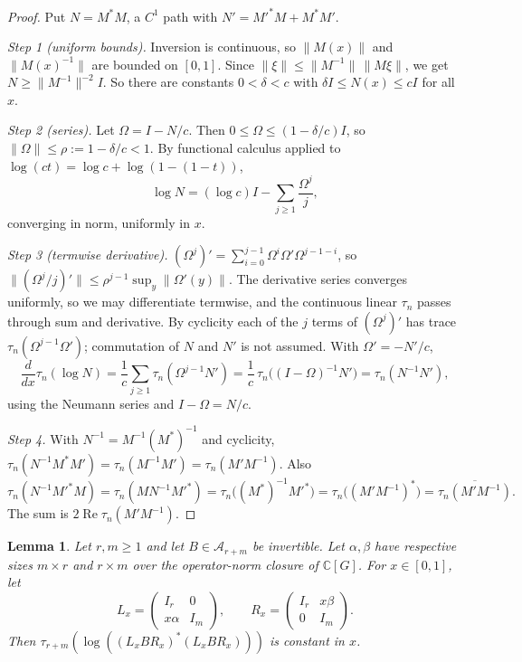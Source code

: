 \documentclass[11pt]{article}
\newtheorem{lemma}[theorem]{Lemma}
\theoremstyle{remark}
\numberwithin{equation}{section}
\newcommand{\C}{\mathbb C}
\begin{document}
\begin{proof}
Put $N=M^*M$, a $C^1$ path with $N'=M'^*M+M^*M'$.

\emph{Step 1 (uniform bounds).} Inversion is continuous, so $\|M(x)\|$ and $\|M(x)^{-1}\|$ are bounded on $[0,1]$. Since $\|\xi\|\le\|M^{-1}\|\,\|M\xi\|$, we get $N\ge\|M^{-1}\|^{-2}I$. So there are constants $0<\delta<c$ with $\delta I\le N(x)\le cI$ for all $x$.

\emph{Step 2 (series).} Let $\Omega=I-N/c$. Then $0\le\Omega\le(1-\delta/c)I$, so $\|\Omega\|\le\rho:=1-\delta/c<1$. By functional calculus applied to $\log(ct)=\log c+\log(1-(1-t))$,
\[
 \log N=(\log c)I-\sum_{j\ge1}\frac{\Omega^j}{j},
\]
converging in norm, uniformly in $x$.

\emph{Step 3 (termwise derivative).} $(\Omega^j)'=\sum_{i=0}^{j-1}\Omega^i\Omega'\Omega^{j-1-i}$, so $\|(\Omega^j/j)'\|\le\rho^{j-1}\sup_y\|\Omega'(y)\|$. The derivative series converges uniformly, so we may differentiate termwise, and the continuous linear $\tau_n$ passes through sum and derivative. By cyclicity each of the $j$ terms of $(\Omega^j)'$ has trace $\tau_n(\Omega^{j-1}\Omega')$; commutation of $N$ and $N'$ is not assumed. With $\Omega'=-N'/c$,
\[
 \frac{d}{dx}\tau_n(\log N)
 =\frac1c\sum_{j\ge1}\tau_n(\Omega^{j-1}N')
 =\frac1c\,\tau_n\bigl((I-\Omega)^{-1}N'\bigr)
 =\tau_n(N^{-1}N'),
\]
using the Neumann series and $I-\Omega=N/c$.

\emph{Step 4.} With $N^{-1}=M^{-1}(M^*)^{-1}$ and cyclicity, $\tau_n(N^{-1}M^*M')=\tau_n(M^{-1}M')=\tau_n(M'M^{-1})$. Also
\[
 \tau_n(N^{-1}M'^*M)=\tau_n(MN^{-1}M'^*)=\tau_n\bigl((M^*)^{-1}M'^*\bigr)=\tau_n\bigl((M'M^{-1})^*\bigr)=\overline{\tau_n(M'M^{-1})}.
\]
The sum is $2\operatorname{Re}\tau_n(M'M^{-1})$.
\end{proof}

\begin{lemma}\label{lem:shears}
Let $r,m\ge1$ and let $B\in\mathcal A_{r+m}$ be invertible.
Let $\alpha,\beta$ have respective sizes $m\times r$ and $r\times m$ over
the operator-norm closure of $\C[G]$. For $x\in[0,1]$, let
\[
L_x=\begin{pmatrix}I_r&0\\x\alpha&I_m\end{pmatrix},\qquad R_x=\begin{pmatrix}I_r&x\beta\\0&I_m\end{pmatrix}.
\]
Then $\tau_{r+m}(\log((L_xBR_x)^*(L_xBR_x)))$ is constant in $x$.
\end{lemma}
\end{document}
